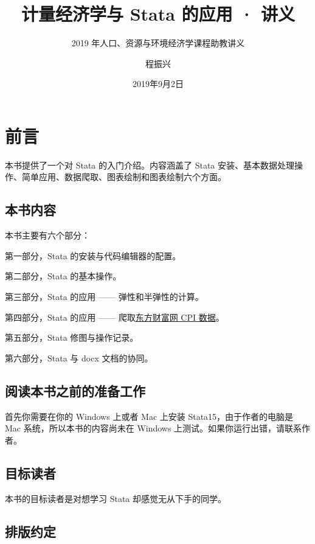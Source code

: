 \documentclass[cn,fancy,blue,11pt]{elegantbook}
\title{计量经济学与 Stata 的应用 · 讲义}
\subtitle{2019 年人口、资源与环境经济学课程助教讲义}
\author{程振兴}
\institute{https://czxa.top}
\date{2019年9月2日}
\begin{document}
\maketitle
\tableofcontents

\mainmatter
\hypersetup{pageanchor=true}

\hypertarget{section}{%
\chapter{前言}\label{section}}

本书提供了一个对 Stata 的入门介绍。内容涵盖了 Stata 安装、基本数据处理操作、简单应用、数据爬取、图表绘制和图表绘制六个方面。

\hypertarget{section-1}{%
\section{本书内容}\label{section-1}}

本书主要有六个部分：

第一部分，Stata 的安装与代码编辑器的配置。

第二部分，Stata 的基本操作。

第三部分，Stata 的应用 ------ 弹性和半弹性的计算。

第四部分，Stata 的应用 ------ 爬取\href{http://data.eastmoney.com/cjsj/cpi.html}{东方财富网 CPI 数据}。

第五部分，Stata 修图与操作记录。

第六部分，Stata 与 docx 文档的协同。

\hypertarget{section-2}{%
\section{阅读本书之前的准备工作}\label{section-2}}

首先你需要在你的 Windows 上或者 Mac 上安装 Stata15，由于作者的电脑是 Mac 系统，所以本书的内容尚未在 Windows 上测试。如果你运行出错，请联系作者。

\hypertarget{section-3}{%
\section{目标读者}\label{section-3}}

本书的目标读者是对想学习 Stata 却感觉无从下手的同学。

\hypertarget{section-4}{%
\section{排版约定}\label{section-4}}
\end{document}

